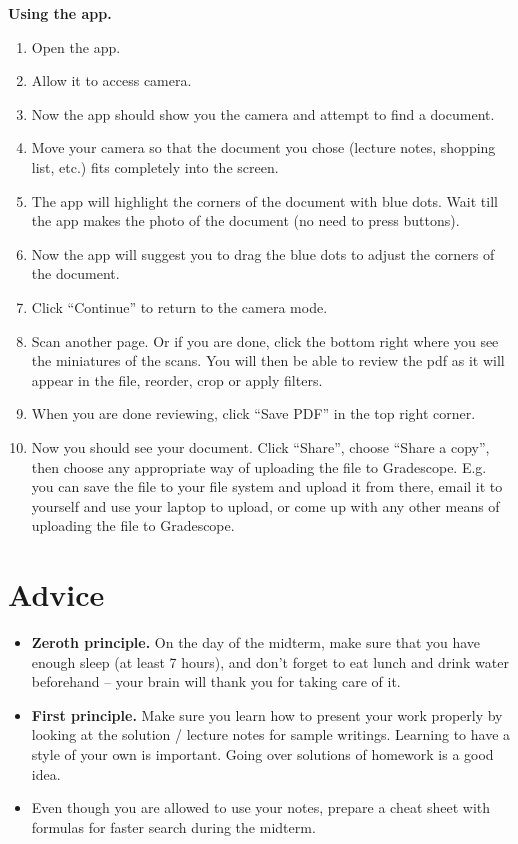 \documentclass[12pt]{amsart}
\begin{document}
\textbf{Using the app.} 
\begin{enumerate}
    \item Open the app.
    \item Allow it to access camera.
    \item Now the app should show you the camera and attempt to find a document.
    \item Move your camera so that the document you chose (lecture notes, shopping list, etc.) fits completely into the screen.
    \item The app will highlight the corners of the document with blue dots. Wait till the app makes the photo of the document (no need to press buttons). 
    \item Now the app will suggest you to drag the blue dots to adjust the corners of the document.
    \item Click ``Continue'' to return to the camera mode.
    \item Scan another page. Or if you are done, click the bottom right where you see the miniatures of the scans. You will then be able to review the pdf as it will appear in the file, reorder, crop or apply filters.
    \item When you are done reviewing, click ``Save PDF'' in the top right corner.
    \item Now you should see your document. Click ``Share'', choose ``Share a copy'', then choose any appropriate way of uploading the file to Gradescope. E.g. you can save the file to your file system and upload it from there, email it to yourself and use your laptop to upload, or come up with any other means of uploading the file to Gradescope.
    
\end{enumerate}



\section*{Advice}

\begin{itemize}
    \item {\bf Zeroth principle.}
On the day of the midterm, make sure that you have enough sleep (at least 7 hours), and don't forget to eat lunch and drink water beforehand -- your brain will thank you for taking care of it.   
    \item {\bf First principle.}
Make sure you learn how to present your work properly by looking
    at the solution / lecture notes for sample writings.
    Learning to have a style of your own is important.
    Going over solutions of homework is a good idea.
    \item Even though you are allowed to use your notes, prepare a cheat sheet with formulas for faster search during the midterm.

\end{itemize}
\end{document}
